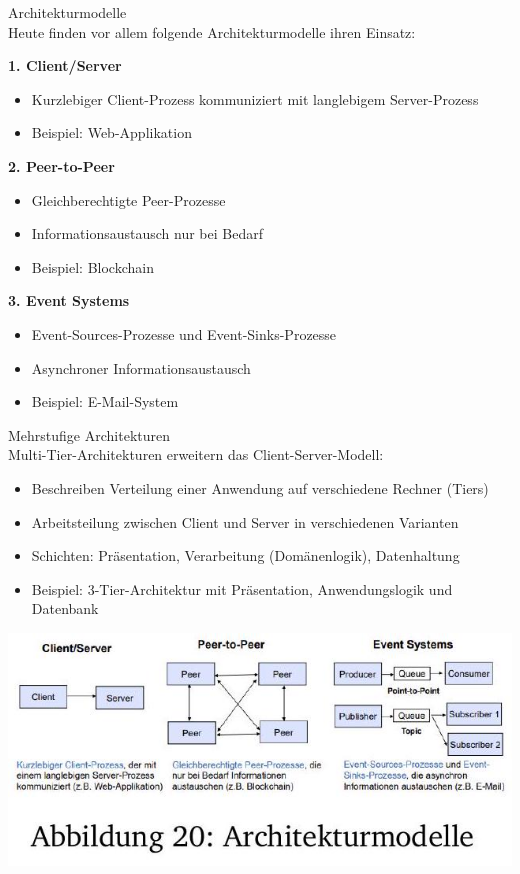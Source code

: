 \begin{theorem}{Architekturmodelle}\\
Heute finden vor allem folgende Architekturmodelle ihren Einsatz:

\textbf{1. Client/Server}
\begin{itemize}
    \item Kurzlebiger Client-Prozess kommuniziert mit langlebigem Server-Prozess
    \item Beispiel: Web-Applikation
\end{itemize}

\textbf{2. Peer-to-Peer}
\begin{itemize}
    \item Gleichberechtigte Peer-Prozesse
    \item Informationsaustausch nur bei Bedarf
    \item Beispiel: Blockchain
\end{itemize}

\textbf{3. Event Systems}
\begin{itemize}
    \item Event-Sources-Prozesse und Event-Sinks-Prozesse
    \item Asynchroner Informationsaustausch
    \item Beispiel: E-Mail-System
\end{itemize}
\end{theorem}

\begin{concept}{Mehrstufige Architekturen}\\
Multi-Tier-Architekturen erweitern das Client-Server-Modell:
\begin{itemize}
    \item Beschreiben Verteilung einer Anwendung auf verschiedene Rechner (Tiers)
    \item Arbeitsteilung zwischen Client und Server in verschiedenen Varianten
    \item Schichten: Präsentation, Verarbeitung (Domänenlogik), Datenhaltung
    \item Beispiel: 3-Tier-Architektur mit Präsentation, Anwendungslogik und Datenbank
\end{itemize}
\includegraphics[width=0.9\linewidth]{images/2024_12_29_0d1d7b5551ea1b4b41bdg-18}
\end{concept}

